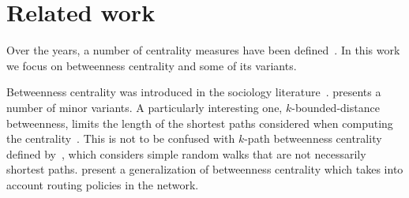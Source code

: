 \section{Related work}\label{sec:prevwork}
Over the years, a number of centrality measures have been defined~\citep{Newman10}. In this work
we focus on betweenness centrality and some of its variants. 

Betweenness centrality was introduced in the sociology
literature~\citep{Anthonisse71,Freeman77}. \citet{Brandes08} presents a number
of minor variants. A particularly interesting one, $k$-bounded-distance
betweenness, limits the length of the shortest paths considered when computing
the centrality~\citep{BorgattiE06,Brandes08,PfefferC12}. This is not to be
confused with $k$-path betweenness centrality defined
by~\citet{KourtellisASIT12}, which considers simple random walks that are not
necessarily shortest paths. \citet{DolevEP10} present a generalization of
betweenness centrality which takes into account routing policies in the network. 

